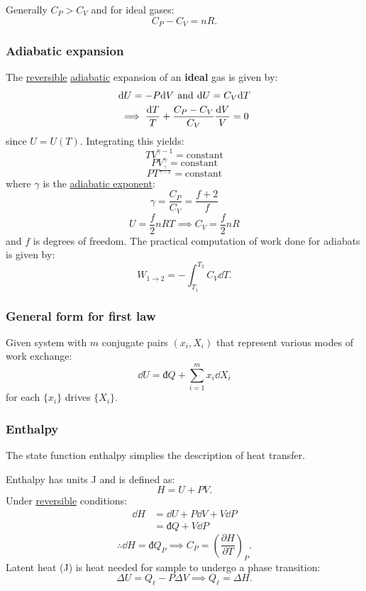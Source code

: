 \documentclass{article}
\newcommand{\idd}{\text{đ}}
\begin{document}
\begin{multicols*}{3}
Generally $C_P>C_V$ and for ideal gases:
$$C_P-C_V=nR.$$

\subsubsection*{Adiabatic expansion}
The \underline{reversible} \underline{adiabatic}
expansion of an \textbf{ideal} gas is given by:
\begin{align*}
    &\dd U=-P\dd V
    \hspace{0.05in}\text{and}\hspace{0.05in}
    \dd U=C_V\dd T \\
    &\implies
    \frac{\dd T}{T}
    +\frac{C_P-C_V}{C_V}\frac{\dd V}{V}=0
\end{align*}
since $U=U(T)$.
Integrating this yields:
$$TV^{\gamma-1}=\text{constant}$$
$$PV^{\gamma}=\text{constant}$$
$$PT^{\frac{\gamma}{\gamma-1}}=\text{constant}$$
where $\gamma$ is the \underline{adiabatic
exponent}:
$$\gamma=\frac{C_P}{C_V}
=\frac{f+2}{f}$$
$$U=\frac{f}{2}nRT
\implies C_V=\frac{f}{2}nR$$
and $f$ is degrees of freedom.
The practical computation of work done
for adiabats is given by:
$$W_{1\rightarrow2}
=-\int_{T_1}^{T_2}C_V\dd T.$$

\subsubsection*{General form for first law}
Given system with $m$ conjugate pairs
$(x_i,X_i)$ that represent various modes
of work exchange:
$$\dd U=\idd Q+
\sum_{i=1}^{m}x_i\dd X_i$$
for each $\{x_i\}$ 
drives $\{X_i\}$.

\columnbreak

\subsubsection*{Enthalpy}
The state function enthalpy simplies the
description of heat transfer. 

Enthalpy has units J
and is defined as:
$$H=U+PV.$$
Under \underline{reversible} conditions:
\begin{align*}
    \dd H
    &=\dd U+P\dd V+V\dd P \\
    &=\idd Q+V\dd P
\end{align*}
$$\therefore\dd H=\idd Q_P
\implies C_P
=\left(\frac{\partial H}{\partial T}\right)_P.$$
Latent heat (J) is heat needed for sample
to undergo a phase transition:
$$\Delta U=Q_{\ell}-P\Delta V
\implies Q_{\ell}=\Delta H.$$


\end{multicols*}
\end{document}
